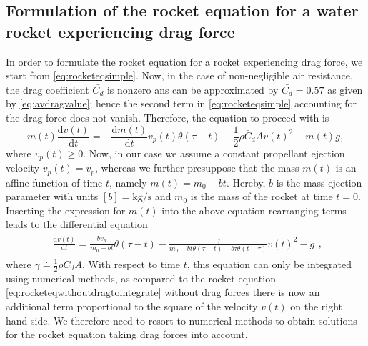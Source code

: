 \documentclass[a4paper,11pt]{report}
\begin{document}
\subsection{Formulation of the rocket equation for a water rocket experiencing drag force}
In order to formulate the rocket equation for a rocket experiencing drag force, we start from \cref{eq:rocketeqsimple}. Now, in the case of non-negligible air resistance, the drag coefficient $\bar{C_{d}}$ is nonzero ans can be approximated by $\bar{C_{d}} = 0.57$ as given by \cref{eq:avdragvalue}; hence the second term in \cref{eq:rocketeqsimple} accounting for the drag force does not vanish. Therefore, the equation to proceed with is \begin{equation}
	m(t)\frac{\mathrm{d}v(t)}{\mathrm{d}t} = -\frac{\mathrm{d}m(t)}{\mathrm{d}t}v_p(t)\theta(\tau-t) - \frac{1}{2}\rho \bar{C}_d A v(t)^2 - m(t) g,
\end{equation} where $v_p(t) \geq 0$. Now, in our case we assume a constant propellant ejection velocity $v_p(t) = v_p$, whereas we further presuppose that the mass $m(t)$ is an affine function of time $t$, namely $m(t) = m_0 - bt$. Hereby, $b$ is the mass ejection parameter with units $[b] = \si{\kilogram\per\second}$ and $m_0$ is the mass of the rocket at time $t=0$. Inserting the expression for $m(t)$ into the above equation rearranging terms leads to the differential equation \begin{align}
\begin{aligned}\label{eq:rocketeqwithdragtointegrate}
\frac{\mathrm{d}v(t)}{\mathrm{d}t} = \frac{bv_p}{m_0-bt}\theta(\tau-t)-\frac{\gamma}{m_0-bt\theta(\tau-t)-b\tau\theta(t-\tau)}v(t)^2-g
\end{aligned},
\end{align} where $\gamma \doteq \tfrac{1}{2}\rho \bar{C_{d}} A$. With respect to time $t$, this equation can only be integrated using numerical methods, as compared to the rocket equation \cref{eq:rocketeqwithoutdragtointegrate} without drag forces there is now an additional term proportional to the square of the velocity $v(t)$ on the right hand side. We therefore need to resort to numerical methods to obtain solutions for the rocket equation taking drag forces into account.
\end{document}
